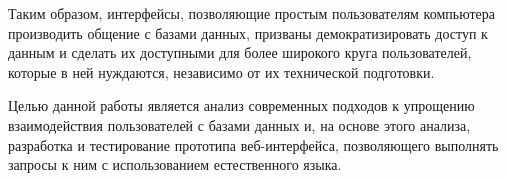 Таким образом, интерфейсы, позволяющие простым пользователям компьютера производить общение
с базами данных, призваны демократизировать доступ к данным и сделать их доступными
для более широкого круга пользователей, которые в ней нуждаются, независимо от их технической подготовки.

Целью данной работы является анализ современных подходов к упрощению взаимодействия пользователей с 
базами данных и, на основе этого анализа, разработка и тестирование прототипа веб-интерфейса, 
позволяющего выполнять запросы к ним с использованием естественного языка.
